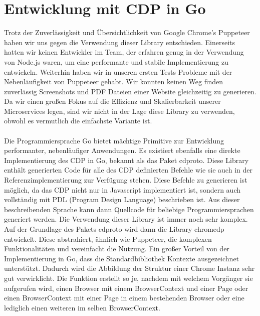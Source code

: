 \section{Entwicklung mit CDP in Go} \label{scraper:sec:chromedp}
Trotz der Zuverlässigkeit und Übersichtlichkeit von Google Chrome’s Puppeteer haben wir uns gegen die Verwendung dieser Library entschieden. Einerseits hatten wir keinen Entwickler im Team, der erfahren genug in der Verwendung von Node.js waren, um eine performante und stabile Implementierung zu entwickeln. Weiterhin haben wir in unseren ersten Tests Probleme mit der Nebenläufigkeit von Puppeteer gehabt. Wir konnten keinen Weg finden zuverlässig Screenshots und PDF Dateien einer Website gleichzeitig zu generieren. Da wir einen großen Fokus auf die Effizienz und Skalierbarkeit unserer Microservices legen, sind wir nicht in der Lage diese Library zu verwenden, obwohl es vermutlich die einfachste Variante ist. \\ \\
Die Programmiersprache Go bietet mächtige Primitive zur Entwicklung performanter, nebenläufiger Anwendungen. Es existiert ebenfalls eine direkte Implementierung des CDP in Go, bekannt als das Paket cdproto. Diese Library enthält generierten Code für alle des CDP definierten Befehle wie sie auch in der Referenzimplementierung zur Verfügung stehen. Diese Befehle zu generieren ist möglich, da das CDP nicht nur in Javascript implementiert ist, sondern auch vollständig mit PDL (Program Design Language) beschrieben ist. Aus dieser beschreibenden Sprache kann dann Quellcode für beliebige Programmiersprachen generiert werden.  \cite{https://github.com/chromedp/cdproto-gen}
Die Verwendung dieser Library ist immer noch sehr komplex. Auf der Grundlage des Pakets cdproto wird dann die Library chromedp entwickelt. Diese abstrahiert, ähnlich wie Puppeteer, die komplexen Funktionalitäten und vereinfacht die Nutzung. Ein großer Vorteil von der Implementierung in Go, dass die Standardbibliothek Kontexte ausgezeichnet unterstützt. \cite{go_context} Dadurch wird die Abbildung der Struktur einer Chrome Instanz sehr gut verwirklicht. Die Funktion  
erstellt so je, nachdem mit welchem Vorgänger sie aufgerufen wird, einen Browser mit einem BrowserContext und einer Page oder einen BrowserContext mit einer Page in einem bestehenden Browser oder eine lediglich einen weiteren  im selben BrowserContext.

